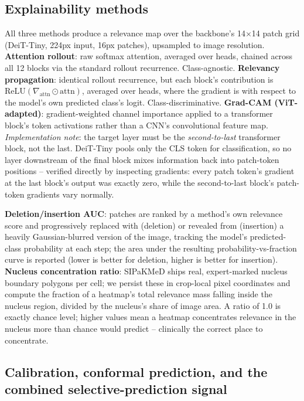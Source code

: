 \documentclass[runningheads]{llncs}
\begin{document}
\subsection{Explainability methods}

All three methods produce a relevance map over the backbone's
14$\times$14 patch grid (DeiT-Tiny, 224px input, 16px patches), upsampled
to image resolution. \textbf{Attention rollout}: raw softmax attention,
averaged over heads, chained across all 12 blocks via the standard
rollout recurrence. Class-agnostic. \textbf{Relevancy propagation}:
identical rollout recurrence, but each block's contribution is
$\mathrm{ReLU}(\nabla_{\text{attn}} \odot \text{attn})$, averaged over
heads, where the gradient is with respect to the model's own predicted
class's logit. Class-discriminative. \textbf{Grad-CAM (ViT-adapted)}:
gradient-weighted channel importance applied to a transformer block's
token activations rather than a CNN's convolutional feature map.
\emph{Implementation note}: the target layer must be the
\emph{second-to-last} transformer block, not the last. DeiT-Tiny pools
only the CLS token for classification, so no layer downstream of the
final block mixes information back into patch-token positions --
verified directly by inspecting gradients: every patch token's gradient
at the last block's output was exactly zero, while the second-to-last
block's patch-token gradients vary normally.

\textbf{Deletion/insertion AUC}: patches are ranked by a method's own
relevance score and progressively replaced with (deletion) or revealed
from (insertion) a heavily Gaussian-blurred version of the image,
tracking the model's predicted-class probability at each step; the area
under the resulting probability-vs-fraction curve is reported (lower is
better for deletion, higher is better for insertion). \textbf{Nucleus
concentration ratio}: SIPaKMeD ships real, expert-marked nucleus boundary
polygons per cell; we persist these in crop-local pixel coordinates and
compute the fraction of a heatmap's total relevance mass falling inside
the nucleus region, divided by the nucleus's share of image area. A ratio
of 1.0 is exactly chance level; higher values mean a heatmap concentrates
relevance in the nucleus more than chance would predict -- clinically the
correct place to concentrate.

\subsection{Calibration, conformal prediction, and the combined selective-prediction signal}
\end{document}
